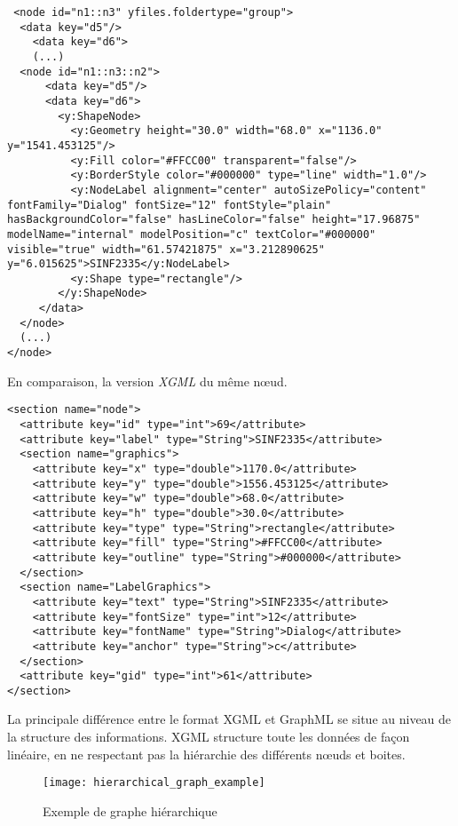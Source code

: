 \begin{lstlisting}
 <node id="n1::n3" yfiles.foldertype="group">
  <data key="d5"/>
    <data key="d6">
    (...)
  <node id="n1::n3::n2">
      <data key="d5"/>
      <data key="d6">
        <y:ShapeNode>
          <y:Geometry height="30.0" width="68.0" x="1136.0" y="1541.453125"/>
          <y:Fill color="#FFCC00" transparent="false"/>
          <y:BorderStyle color="#000000" type="line" width="1.0"/>
          <y:NodeLabel alignment="center" autoSizePolicy="content" fontFamily="Dialog" fontSize="12" fontStyle="plain" hasBackgroundColor="false" hasLineColor="false" height="17.96875" modelName="internal" modelPosition="c" textColor="#000000" visible="true" width="61.57421875" x="3.212890625" y="6.015625">SINF2335</y:NodeLabel>
          <y:Shape type="rectangle"/>
        </y:ShapeNode>
     </data>
  </node>
  (...)
</node>
\end{lstlisting}

En comparaison, la version \textit{XGML} du même nœud.
\begin{lstlisting}
<section name="node">
  <attribute key="id" type="int">69</attribute>
  <attribute key="label" type="String">SINF2335</attribute>
  <section name="graphics">
    <attribute key="x" type="double">1170.0</attribute>
    <attribute key="y" type="double">1556.453125</attribute>
    <attribute key="w" type="double">68.0</attribute>
    <attribute key="h" type="double">30.0</attribute>
    <attribute key="type" type="String">rectangle</attribute>
    <attribute key="fill" type="String">#FFCC00</attribute>
    <attribute key="outline" type="String">#000000</attribute>
  </section>
  <section name="LabelGraphics">
    <attribute key="text" type="String">SINF2335</attribute>
    <attribute key="fontSize" type="int">12</attribute>
    <attribute key="fontName" type="String">Dialog</attribute>
    <attribute key="anchor" type="String">c</attribute>
  </section>
  <attribute key="gid" type="int">61</attribute>
</section>
\end{lstlisting}

La principale différence entre le format XGML et GraphML se situe au niveau de la structure des informations. XGML structure toute les données de façon linéaire, en ne respectant pas la hiérarchie des différents nœuds et boites.

\begin{figure}
\centering
\caption{Exemple de graphe hiérarchique} 
\label{fig:hierarchical_graph_example}
\texttt{[image: hierarchical\_graph\_example]}
\end{figure}

